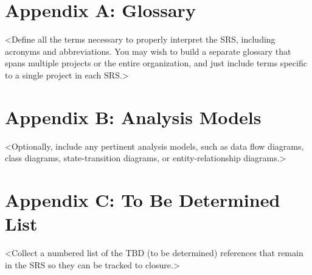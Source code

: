 \documentclass{article}
\begin{document}
\section{Appendix A: Glossary}
<Define all the terms necessary to properly interpret the SRS, including acronyms and abbreviations. You may wish to build a separate glossary that spans multiple projects or the entire organization, and just include terms specific to a single project in each SRS.>
\section{Appendix B: Analysis Models}
<Optionally, include any pertinent analysis models, such as data flow diagrams, class diagrams, state-transition diagrams, or entity-relationship diagrams.>
\section{Appendix C: To Be Determined List}
<Collect a numbered list of the TBD (to be determined) references that remain in the SRS so they can be tracked to closure.>
\end{document}
